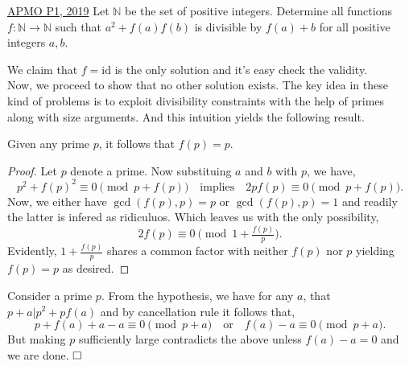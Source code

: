 \begin{problem}{2}{\href{https://artofproblemsolving.com/community/c6h1854148p12519631}{APMO P1, 2019}}
	Let $\mathbb{N}$ be the set of positive integers. Determine all functions $f:\mathbb{N}\to\mathbb{N}$ such that $a^2+f(a)f(b)$ is divisible by $f(a)+b$ for all positive integers $a,b$.
	\begin{solution} We claim that $f=\text{id}$ is the only solution and it's easy check the validity.\\
		\indent Now, we proceed to show that no other solution exists. The key idea in these kind of problems is to exploit divisibility constraints with the help of primes along with size arguments. And this intuition yields the following result.
		
		\begin{claim}
			Given any prime $p$, it follows that $f(p)=p$.
		\end{claim}
		\begin{proof}
			Let $p$ denote a prime. Now substituing $a$ and $b$ with $p$, we have,
			\[p^2+f(p)^2\equiv 0\pmod{p+f(p)}\quad\text{implies}\quad 2pf(p)\equiv 0\pmod{p+f(p)} .\]
			Now, we either have $\gcd(f(p), p)=p$ or $\gcd(f(p), p)=1$ and readily the latter is infered as ridiculuos. Which leaves us with the only possibility,
			\[2f(p)\equiv 0\pmod{1+\tfrac{f(p)}{p}}.\]
			Evidently, $1+\tfrac{f(p)}{p}$ shares a common factor with neither $f(p)$ nor $p$ yielding $f(p)=p$ as desired.
		\end{proof}
		
		\indent Consider a prime $p$. From the hypothesis, we have for any $a$, that $p+a\lvert p^2+pf(a)$ and by cancellation rule it follows that,
		\[p+f(a)+a-a\equiv 0\pmod {p+a}\quad\text{or}\quad f(a)-a\equiv 0\pmod{p+a}.\]
		But making $p$ sufficiently large contradicts the above unless $f(a)-a=0$ and we are done. $\qedwhite$
	\end{solution}
\end{problem}
	

